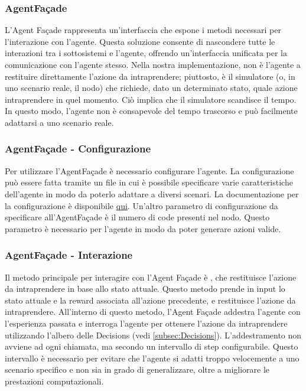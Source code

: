 \documentclass[conference]{IEEEtran}
\begin{document}
\subsubsection{AgentFaçade}
L'Agent Façade rappresenta un'interfaccia che espone i metodi necessari per l'interazione con l'agente. Questa soluzione consente di nascondere tutte le interazioni tra i sottosistemi e l'agente, offrendo un'interfaccia unificata per la comunicazione con l'agente stesso. Nella nostra implementazione, non è l'agente a restituire direttamente l'azione da intraprendere; piuttosto, è il simulatore (o, in uno scenario reale, il nodo) che richiede, dato un determinato stato, quale azione intraprendere in quel momento. Ciò implica che il simulatore scandisce il tempo. In questo modo, l'agente non è consapevole del tempo trascorso e può facilmente adattarsi a uno scenario reale.
\subsubsection{AgentFaçade - Configurazione} 
Per utilizzare l'AgentFaçade è necessario configurare l'agente. La configurazione può essere fatta tramite un file in cui è possibile specificare varie caratteristiche dell'agente in modo da poterlo adattare a diversi scenari. La documentazione per la configurazione è disponibile \href{https://github.com/retarded-reward/collaborative-learning/wiki/Agent-Configuration}{qui}. Un'altro parametro di configurazione da specificare all'AgentFaçade è il numero di code presenti nel nodo. Questo parametro è necessario per l'agente in modo da poter generare azioni valide.
\subsubsection{AgentFaçade - Interazione}
Il metodo principale per interagire con l'Agent Façade è , che restituisce l'azione da intraprendere in base allo stato attuale. Questo metodo prende in input lo stato attuale e la reward associata all'azione precedente, e restituisce l'azione da intraprendere. All'interno di questo metodo, l'Agent Façade addestra l'agente con l'esperienza passata e interroga l'agente per ottenere l'azione da intraprendere utilizzando l'albero delle Decisions  (vedi \autoref{subsec:Decisions}). L'addestramento non avviene ad ogni chiamata, ma secondo un intervallo di step configurabile. Questo intervallo è necessario per evitare che l'agente si adatti troppo velocemente a uno scenario specifico e non sia in grado di generalizzare, oltre a migliorare le prestazioni computazionali.
\end{document}

